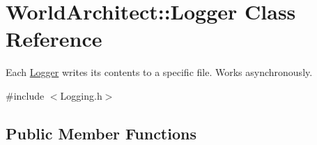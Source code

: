 \hypertarget{class_world_architect_1_1_logger}{}\section{World\+Architect\+::Logger Class Reference}
\label{class_world_architect_1_1_logger}


Each \mbox{\hyperlink{class_world_architect_1_1_logger}{Logger}} writes it\textquotesingle{}s contents to a specific file. Works asynchronously.  




{\ttfamily \#include $<$Logging.\+h$>$}

\subsection*{Public Member Functions}
